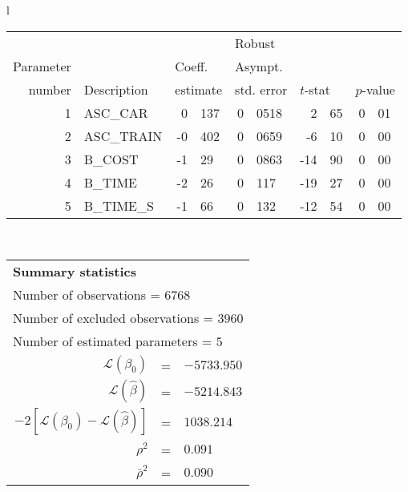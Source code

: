   \begin{tabular}{l}
\begin{tabular}{rlr@{.}lr@{.}lr@{.}lr@{.}l}
         &                       &   \multicolumn{2}{l}{}    & \multicolumn{2}{l}{Robust}  &     \multicolumn{4}{l}{}   \\
Parameter &                       &   \multicolumn{2}{l}{Coeff.}      & \multicolumn{2}{l}{Asympt.}  &     \multicolumn{4}{l}{}   \\
number &  Description                     &   \multicolumn{2}{l}{estimate}      & \multicolumn{2}{l}{std. error}  &   \multicolumn{2}{l}{$t$-stat}  &   \multicolumn{2}{l}{$p$-value}   \\

\hline

1 & ASC_CAR & 0&137 & 0&0518 & 2&65 & 0&01\\
2 & ASC_TRAIN & -0&402 & 0&0659 & -6&10 & 0&00\\
3 & B_COST & -1&29 & 0&0863 & -14&90 & 0&00\\
4 & B_TIME & -2&26 & 0&117 & -19&27 & 0&00\\
5 & B_TIME_S & -1&66 & 0&132 & -12&54 & 0&00\\
\hline
\end{tabular}
\\
\begin{tabular}{rcl}
\multicolumn{3}{l}{\bf Summary statistics}\\
\multicolumn{3}{l}{ Number of observations = $6768$} \\
\multicolumn{3}{l}{ Number of excluded observations = $3960$} \\
\multicolumn{3}{l}{ Number of estimated  parameters = $5$} \\
 $\mathcal{L}(\beta_0)$ &=&  $-5733.950$ \\
 $\mathcal{L}(\hat{\beta})$ &=& $-5214.843 $  \\
 $-2[\mathcal{L}(\beta_0) -\mathcal{L}(\hat{\beta})]$ &=& $1038.214$ \\
    $\rho^2$ &=&   $0.091$ \\
    $\bar{\rho}^2$ &=&    $0.090$ \\
\end{tabular}
  \end{tabular}
